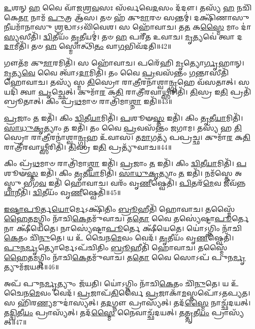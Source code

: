    \ul{𑌉}\-𑌶𑌨𑍍 \ul{𑌹} 𑌵𑍈 𑌵𑌾᳴𑌜𑌶𑍍𑌰\-\ul{𑌵}\-𑌸𑌃 𑌸᳴𑌰𑍍𑌵𑌵𑍇\-\ul{𑌦}\-𑌸𑌂 𑌦᳴𑌦𑍗।
   𑌤𑌸𑍍𑌯᳴ \ul{𑌹} 𑌨𑌚𑌿᳴𑌕𑍇\-\ul{𑌤𑌾} 𑌨𑌾𑌮᳴ \ul{𑌪𑍁}\-𑌤𑍍𑌰 𑌆᳴𑌸।
   𑌤𑍞 𑌹᳴ 𑌕𑍁\-\ul{𑌮𑌾}\-𑌰𑍞 𑌸𑌨𑍍𑌤𑌮𑍍॑।
   𑌦𑌕𑍍𑌷𑌿᳴𑌣𑌾𑌸𑍁 \ul{𑌨𑍀}\-𑌯𑌮𑌾᳴𑌨𑌾𑌸𑍁 \ul{𑌶𑍍𑌰}\-𑌦𑍍𑌧𑌾𑌽𑌽𑌵𑌿᳴𑌵𑍇𑌶।
   𑌸 𑌹𑍋᳴𑌵𑌾𑌚।
   𑌤\-\ul{𑌤} 𑌕\-\ul{𑌸𑍍𑌮𑍈} 𑌮𑌾𑌂 𑌦𑌾॑\-\ul{𑌸𑍍𑌯}\-𑌸𑍀𑌤𑌿᳴।
   \ul{𑌦𑍍𑌵𑌿}\-𑌤𑍀𑌯𑌂᳴ \ul{𑌤𑍃}\-𑌤𑍀𑌯𑌮𑍍॑।
   𑌤𑍞 \ul{𑌹} 𑌪𑌰𑍀᳴𑌤 𑌉𑌵𑌾𑌚।
   \ul{𑌮𑍃}\-𑌤𑍍𑌯𑌵𑍇॑ 𑌤𑍍𑌵𑌾 𑌦\-\ul{𑌦𑌾}\-𑌮𑍀𑌤𑌿᳴।
   𑌤𑍞 \ul{𑌹} 𑌸𑍍𑌮𑍋𑌤𑍍𑌥𑌿᳴\-\ul{𑌤𑌂} 𑌵𑌾\-\ul{𑌗}\-𑌭𑌿𑌵᳴𑌦𑌤𑌿॥42॥

   𑌗𑍗𑌤᳴𑌮 𑌕𑍁\-\ul{𑌮𑌾}\-𑌰𑌮𑌿𑌤𑌿᳴।
   𑌸 𑌹𑍋᳴𑌵𑌾𑌚।
   𑌪𑌰𑍇᳴𑌹𑌿 \ul{𑌮𑍃}\-𑌤𑍍𑌯𑍋\-\ul{𑌰𑍍𑌗𑍃}\-𑌹𑌾𑌨𑍍।
   \ul{𑌮𑍃}\-𑌤𑍍𑌯\-\ul{𑌵𑍇} 𑌵𑍈 𑌤𑍍𑌵𑌾᳴𑌽\-\ul{𑌦𑌾}\-𑌮𑌿𑌤𑌿᳴।
   𑌤𑌂 𑌵𑍈 \ul{𑌪𑍍𑌰}\-𑌵𑌸᳴𑌨𑍍𑌤𑌂 \ul{𑌗}\-𑌨𑍍𑌤𑌾𑌸𑍀𑌤𑌿᳴ 𑌹𑍋𑌵𑌾𑌚।
   𑌤𑌸𑍍𑌯᳴ 𑌸𑍍𑌮 \ul{𑌤𑌿}\-𑌸𑍍𑌰𑍋 𑌰𑌾\-\ul{𑌤𑍍𑌰𑍀}\-𑌰𑌨𑌾॑𑌶𑍍𑌵𑌾\-\ul{𑌨𑍍𑌗𑍃}\-𑌹𑍇 𑌵᳴𑌸𑌤𑌾𑌤𑍍।
   𑌸 𑌯𑌦𑌿᳴ 𑌤𑍍𑌵𑌾 \ul{𑌪𑍃}\-𑌚𑍍𑌛𑍇𑌤𑍍।
   𑌕𑍁𑌮𑌾᳴\-\ul{𑌰} 𑌕\-\ul{𑌤𑌿} 𑌰𑌾𑌤𑍍𑌰𑍀᳴𑌰𑌵𑌾\-\ul{𑌥𑍍𑌸𑍀}\-𑌰𑌿𑌤𑌿᳴।
   \ul{𑌤𑌿}\-𑌸𑍍𑌰 𑌇\-\ul{𑌤𑌿} 𑌪𑍍𑌰𑌤𑌿᳴𑌬𑍍𑌰𑍂𑌤𑌾𑌤𑍍।
   𑌕𑌿𑌂 𑌪𑍍𑌰᳴\-\ul{𑌥}\-𑌮𑌾𑍞 𑌰𑌾𑌤𑍍𑌰𑌿᳴𑌮𑌾\-\ul{𑌶𑍍𑌨𑌾} 𑌇𑌤𑌿᳴॥43॥

   \ul{𑌪𑍍𑌰}\-𑌜𑌾𑌂 \ul{𑌤} 𑌇𑌤𑌿᳴।
   𑌕𑌿𑌂 \ul{𑌦𑍍𑌵𑌿}\-𑌤𑍀\-\ul{𑌯𑌾}\-𑌮𑌿𑌤𑌿᳴।
   \ul{𑌪}\-𑌶𑍂𑍟\-\ul{𑌸𑍍𑌤} 𑌇𑌤𑌿᳴।
   𑌕𑌿𑌂 \ul{𑌤𑍃}\-𑌤𑍀\-\ul{𑌯𑌾}\-𑌮𑌿𑌤𑌿᳴।
   \ul{𑌸𑌾}\-\-\ul{𑌧𑍁}\-\-\ul{𑌕𑍃}\-𑌤𑍍𑌯𑌾𑌂 \ul{𑌤} 𑌇𑌤𑌿᳴।
   𑌤𑌂 𑌵𑍈 \ul{𑌪𑍍𑌰}\-𑌵𑌸᳴𑌨𑍍𑌤𑌂 𑌜𑌗𑌾𑌮।
   𑌤𑌸𑍍𑌯᳴ 𑌹 \ul{𑌤𑌿}\-𑌸𑍍𑌰𑍋 𑌰𑌾\-\ul{𑌤𑍍𑌰𑍀}\-𑌰𑌨𑌾॑𑌶𑍍𑌵𑌾\-\ul{𑌨𑍍𑌗𑍃}\-𑌹 𑌉᳴𑌵𑌾𑌸।
   𑌤\-\ul{𑌮𑌾}\-𑌗𑌤𑍍𑌯᳴ 𑌪𑌪𑍍𑌰𑌚𑍍𑌛।
   𑌕𑍁𑌮𑌾᳴\-\ul{𑌰} 𑌕\-\ul{𑌤𑌿} 𑌰𑌾𑌤𑍍𑌰𑍀᳴𑌰𑌵𑌾\-\ul{𑌥𑍍𑌸𑍀}\-𑌰𑌿𑌤𑌿᳴।
   \ul{𑌤𑌿}\-𑌸𑍍𑌰 𑌇\-\ul{𑌤𑌿} 𑌪𑍍𑌰𑌤𑍍𑌯𑍁᳴𑌵𑌾𑌚॥44॥

   𑌕𑌿𑌂 𑌪𑍍𑌰᳴\-\ul{𑌥}\-𑌮𑌾𑍞 𑌰𑌾𑌤𑍍𑌰𑌿᳴𑌮𑌾\-\ul{𑌶𑍍𑌨𑌾} 𑌇𑌤𑌿᳴।
   \ul{𑌪𑍍𑌰}\-𑌜𑌾𑌂 \ul{𑌤} 𑌇𑌤𑌿᳴।
   𑌕𑌿𑌂 \ul{𑌦𑍍𑌵𑌿}\-𑌤𑍀\-\ul{𑌯𑌾}\-𑌮𑌿𑌤𑌿᳴।
   \ul{𑌪}\-𑌶𑍂𑍟\-\ul{𑌸𑍍𑌤} 𑌇𑌤𑌿᳴।
   𑌕𑌿𑌂 \ul{𑌤𑍃}\-𑌤𑍀\-\ul{𑌯𑌾}\-𑌮𑌿𑌤𑌿᳴।
   \ul{𑌸𑌾}\-\-\ul{𑌧𑍁}\-\-\ul{𑌕𑍃}\-𑌤𑍍𑌯𑌾𑌂 \ul{𑌤} 𑌇𑌤𑌿᳴।
   𑌨𑌮᳴𑌸𑍍𑌤𑍇 𑌅𑌸𑍍𑌤𑍁 𑌭𑌗\-\ul{𑌵} 𑌇𑌤𑌿᳴ 𑌹𑍋𑌵𑌾𑌚।
   𑌵𑌰𑌂᳴ 𑌵𑍃\-\ul{𑌣𑍀}\-𑌷𑍍𑌵𑍇𑌤𑌿᳴।
   \ul{𑌪𑌿}\-𑌤𑌰᳴\-\ul{𑌮𑍇}\-𑌵 𑌜𑍀𑌵᳴𑌨𑍍𑌨\-\ul{𑌯𑌾}\-𑌨𑍀𑌤𑌿᳴।
   \ul{𑌦𑍍𑌵𑌿}\-𑌤𑍀𑌯𑌂᳴ 𑌵𑍃\-\ul{𑌣𑍀}\-𑌷𑍍𑌵𑍇𑌤𑌿᳴॥45॥

   \ul{𑌇}\-\-\ul{𑌷𑍍𑌟𑌾}\-\-\ul{𑌪𑍂}\-𑌰𑍍𑌤\-\ul{𑌯𑍋}\-𑌰𑍍𑌮𑍇𑌽𑌕𑍍𑌷𑌿᳴𑌤𑌿𑌂 \ul{𑌬𑍍𑌰𑍂}\-𑌹𑍀𑌤𑌿᳴ 𑌹𑍋𑌵𑌾𑌚।
   𑌤𑌸𑍍𑌮𑍈᳴ \ul{𑌹𑍈}\-𑌤\-\ul{𑌮}\-𑌗𑍍𑌨𑌿𑌂 𑌨𑌾᳴𑌚𑌿\-\ul{𑌕𑍇}\-𑌤𑌮𑍁᳴𑌵𑌾𑌚।
   𑌤\-\ul{𑌤𑍋} 𑌵𑍈 𑌤𑌸𑍍𑌯𑍇॑𑌷𑍍𑌟𑌾\-\ul{𑌪𑍂}\-𑌰𑍍𑌤𑍇 𑌨𑌾 𑌕𑍍𑌷𑍀᳴𑌯𑍇𑌤𑍇।
   𑌨𑌾𑌸𑍍𑌯𑍇॑𑌷𑍍𑌟𑌾\-\ul{𑌪𑍂}\-𑌰𑍍𑌤𑍇 𑌕𑍍𑌷𑍀᳴𑌯𑍇𑌤𑍇।
   𑌯𑍋॑𑌽𑌗𑍍𑌨𑌿𑌂 𑌨𑌾᳴𑌚𑌿\-\ul{𑌕𑍇}\-𑌤𑌂 𑌚𑌿᳴\-\ul{𑌨𑍁}\-𑌤𑍇।
   𑌯 𑌉᳴ 𑌚𑍈𑌨\-\ul{𑌮𑍇}\-𑌵𑌂 𑌵𑍇𑌦᳴।
   \ul{𑌤𑍃}\-𑌤𑍀𑌯𑌂᳴ 𑌵𑍃\-\ul{𑌣𑍀}\-𑌷𑍍𑌵𑍇𑌤𑌿᳴।
   \ul{𑌪𑍁}\-\-\ul{𑌨}\-\-\ul{𑌰𑍍𑌮𑍃}\-𑌤𑍍𑌯𑍋𑌰𑍍𑌮𑍇𑌽𑌪᳴𑌚𑌿𑌤𑌿𑌂 \ul{𑌬𑍍𑌰𑍂}\-𑌹𑍀𑌤𑌿᳴ 𑌹𑍋𑌵𑌾𑌚।
   𑌤𑌸𑍍𑌮𑍈᳴ \ul{𑌹𑍈}\-𑌤\-\ul{𑌮}\-𑌗𑍍𑌨𑌿𑌂 𑌨𑌾᳴𑌚𑌿\-\ul{𑌕𑍇}\-𑌤𑌮𑍁᳴𑌵𑌾𑌚।
   𑌤\-\ul{𑌤𑍋} 𑌵𑍈 𑌸𑍋𑌽𑌪᳴ 𑌪𑍁𑌨\-\ul{𑌰𑍍𑌮𑍃}\-𑌤𑍍𑌯𑍁𑌮᳴𑌜𑌯𑌤𑍍॥46॥

   𑌅𑌪᳴ 𑌪𑍁𑌨\-\ul{𑌰𑍍𑌮𑍃}\-𑌤𑍍𑌯𑍁𑌂 𑌜᳴𑌯𑌤𑌿।
   𑌯𑍋॑𑌽𑌗𑍍𑌨𑌿𑌂 𑌨𑌾᳴𑌚𑌿\-\ul{𑌕𑍇}\-𑌤𑌂 𑌚𑌿᳴\-\ul{𑌨𑍁}\-𑌤𑍇।
   𑌯 𑌉᳴ 𑌚𑍈𑌨\-\ul{𑌮𑍇}\-𑌵𑌂 𑌵𑍇𑌦᳴।
   \ul{𑌪𑍍𑌰}\-𑌜𑌾𑌪᳴\-\ul{𑌤𑌿}\-𑌰𑍍𑌵𑍈 \ul{𑌪𑍍𑌰}\-𑌜𑌾𑌕𑌾᳴\-\ul{𑌮}\-𑌸𑍍𑌤𑌪𑍋᳴𑌽𑌤𑌪𑍍𑌯𑌤।
   𑌸 𑌹𑌿᳴𑌰\-\ul{𑌣𑍍𑌯}\-𑌮𑍁𑌦𑌾॑𑌸𑍍𑌯𑌤𑍍।
   𑌤\-\ul{𑌦}\-𑌗𑍍𑌨𑍗 𑌪𑍍𑌰𑌾𑌸𑍍𑌯᳴𑌤𑍍।
   𑌤𑌦᳴\-\ul{𑌸𑍍𑌮𑍈} 𑌨𑌾𑌚𑍍𑌛᳴𑌦𑌯𑌤𑍍।
   𑌤\-\ul{𑌦𑍍𑌦𑍍𑌵𑌿}\-𑌤𑍀\-\ul{𑌯𑌂} 𑌪𑍍𑌰𑌾𑌸𑍍𑌯᳴𑌤𑍍।
   𑌤𑌦᳴\-\ul{𑌸𑍍𑌮𑍈} 𑌨𑍈𑌵𑌾𑌚𑍍𑌛᳴𑌦𑌯𑌤𑍍।
   𑌤\-\ul{𑌤𑍍𑌤𑍃}\-𑌤𑍀\-\ul{𑌯𑌂} 𑌪𑍍𑌰𑌾𑌸𑍍𑌯᳴𑌤𑍍॥47॥

